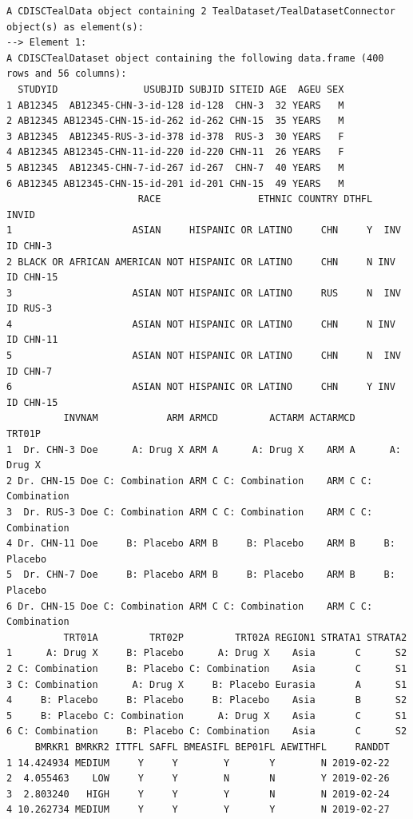 \documentclass[
  letterpaper,
  DIV=11,
  numbers=noendperiod]{scrreprt}
\begin{document}
\begin{tcolorbox}[enhanced jigsaw, leftrule=.75mm, arc=.35mm, colback=white, colframe=quarto-callout-note-color-frame, opacityback=0, toprule=.15mm, bottomrule=.15mm, rightrule=.15mm, left=2mm, breakable]
\begin{minipage}[t]{\textwidth - 5.5mm}
\begin{verbatim}
A CDISCTealData object containing 2 TealDataset/TealDatasetConnector object(s) as element(s):
--> Element 1:
A CDISCTealDataset object containing the following data.frame (400 rows and 56 columns):
  STUDYID               USUBJID SUBJID SITEID AGE  AGEU SEX
1 AB12345  AB12345-CHN-3-id-128 id-128  CHN-3  32 YEARS   M
2 AB12345 AB12345-CHN-15-id-262 id-262 CHN-15  35 YEARS   M
3 AB12345  AB12345-RUS-3-id-378 id-378  RUS-3  30 YEARS   F
4 AB12345 AB12345-CHN-11-id-220 id-220 CHN-11  26 YEARS   F
5 AB12345  AB12345-CHN-7-id-267 id-267  CHN-7  40 YEARS   M
6 AB12345 AB12345-CHN-15-id-201 id-201 CHN-15  49 YEARS   M
                       RACE                 ETHNIC COUNTRY DTHFL         INVID
1                     ASIAN     HISPANIC OR LATINO     CHN     Y  INV ID CHN-3
2 BLACK OR AFRICAN AMERICAN NOT HISPANIC OR LATINO     CHN     N INV ID CHN-15
3                     ASIAN NOT HISPANIC OR LATINO     RUS     N  INV ID RUS-3
4                     ASIAN NOT HISPANIC OR LATINO     CHN     N INV ID CHN-11
5                     ASIAN NOT HISPANIC OR LATINO     CHN     N  INV ID CHN-7
6                     ASIAN NOT HISPANIC OR LATINO     CHN     Y INV ID CHN-15
          INVNAM            ARM ARMCD         ACTARM ACTARMCD         TRT01P
1  Dr. CHN-3 Doe      A: Drug X ARM A      A: Drug X    ARM A      A: Drug X
2 Dr. CHN-15 Doe C: Combination ARM C C: Combination    ARM C C: Combination
3  Dr. RUS-3 Doe C: Combination ARM C C: Combination    ARM C C: Combination
4 Dr. CHN-11 Doe     B: Placebo ARM B     B: Placebo    ARM B     B: Placebo
5  Dr. CHN-7 Doe     B: Placebo ARM B     B: Placebo    ARM B     B: Placebo
6 Dr. CHN-15 Doe C: Combination ARM C C: Combination    ARM C C: Combination
          TRT01A         TRT02P         TRT02A REGION1 STRATA1 STRATA2
1      A: Drug X     B: Placebo      A: Drug X    Asia       C      S2
2 C: Combination     B: Placebo C: Combination    Asia       C      S1
3 C: Combination      A: Drug X     B: Placebo Eurasia       A      S1
4     B: Placebo     B: Placebo     B: Placebo    Asia       B      S2
5     B: Placebo C: Combination      A: Drug X    Asia       C      S1
6 C: Combination     B: Placebo C: Combination    Asia       C      S2
     BMRKR1 BMRKR2 ITTFL SAFFL BMEASIFL BEP01FL AEWITHFL     RANDDT
1 14.424934 MEDIUM     Y     Y        Y       Y        N 2019-02-22
2  4.055463    LOW     Y     Y        N       N        Y 2019-02-26
3  2.803240   HIGH     Y     Y        Y       N        N 2019-02-24
4 10.262734 MEDIUM     Y     Y        Y       Y        N 2019-02-27

\end{verbatim}
\end{minipage}
\end{tcolorbox}
\end{document}
